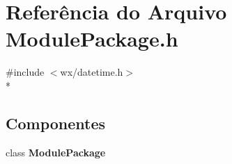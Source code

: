 \section{Referência do Arquivo Module\+Package.\+h}
\label{_module_package_8h}
{\ttfamily \#include $<$wx/datetime.\+h$>$}\\*
\subsection*{Componentes}
\begin{DoxyCompactItemize}
\item 
class {\bf Module\+Package}
\end{DoxyCompactItemize}
